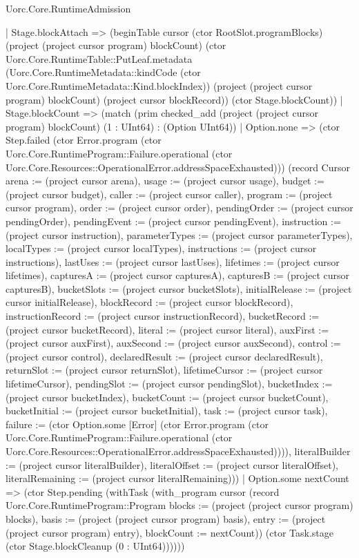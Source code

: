 \begin{lexlean}{Uorc.Core.RuntimeAdmission}
\begin{semanticmodule}
{      | Stage.blockAttach => (beginTable cursor (ctor RootSlot.programBlocks) (project (project cursor program) blockCount) (ctor Uorc.Core.RuntimeTable::PutLeaf.metadata (Uorc.Core.RuntimeMetadata::kindCode (ctor Uorc.Core.RuntimeMetadata::Kind.blockIndex)) (project (project cursor program) blockCount) (project cursor blockRecord)) (ctor Stage.blockCount))
      | Stage.blockCount => (match (prim checked_add (project (project cursor program) blockCount) (1 : UInt64) : (Option UInt64))
        | Option.none => (ctor Step.failed (ctor Error.program (ctor Uorc.Core.RuntimeProgram::Failure.operational (ctor Uorc.Core.Resources::OperationalError.addressSpaceExhausted))) (record Cursor {arena := (project cursor arena), usage := (project cursor usage), budget := (project cursor budget), caller := (project cursor caller), program := (project cursor program), order := (project cursor order), pendingOrder := (project cursor pendingOrder), pendingEvent := (project cursor pendingEvent), instruction := (project cursor instruction), parameterTypes := (project cursor parameterTypes), localTypes := (project cursor localTypes), instructions := (project cursor instructions), lastUses := (project cursor lastUses), lifetimes := (project cursor lifetimes), capturesA := (project cursor capturesA), capturesB := (project cursor capturesB), bucketSlots := (project cursor bucketSlots), initialRelease := (project cursor initialRelease), blockRecord := (project cursor blockRecord), instructionRecord := (project cursor instructionRecord), bucketRecord := (project cursor bucketRecord), literal := (project cursor literal), auxFirst := (project cursor auxFirst), auxSecond := (project cursor auxSecond), control := (project cursor control), declaredResult := (project cursor declaredResult), returnSlot := (project cursor returnSlot), lifetimeCursor := (project cursor lifetimeCursor), pendingSlot := (project cursor pendingSlot), bucketIndex := (project cursor bucketIndex), bucketCount := (project cursor bucketCount), bucketInitial := (project cursor bucketInitial), task := (project cursor task), failure := (ctor Option.some [Error] (ctor Error.program (ctor Uorc.Core.RuntimeProgram::Failure.operational (ctor Uorc.Core.Resources::OperationalError.addressSpaceExhausted)))), literalBuilder := (project cursor literalBuilder), literalOffset := (project cursor literalOffset), literalRemaining := (project cursor literalRemaining)}))
        | Option.some nextCount => (ctor Step.pending (withTask (with_program cursor (record Uorc.Core.RuntimeProgram::Program {blocks := (project (project cursor program) blocks), basis := (project (project cursor program) basis), entry := (project (project cursor program) entry), blockCount := nextCount})) (ctor Task.stage (ctor Stage.blockCleanup (0 : UInt64))))))
}
\end{semanticmodule}
\end{lexlean}
